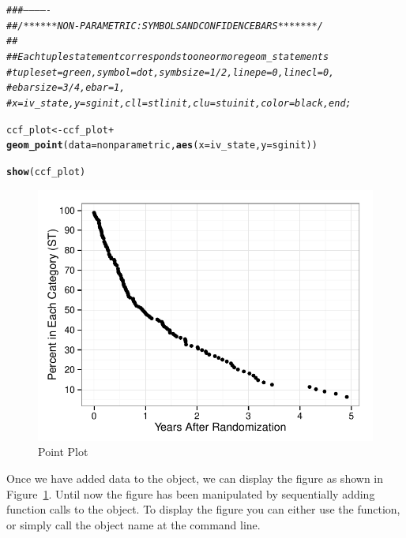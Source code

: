 \documentclass[nojss, letterpaper]{jss}\usepackage[]{graphicx}\usepackage[]{color}
\makeatletter
\def\maxwidth{ %
  \ifdim\Gin@nat@width>\linewidth
    \linewidth
  \else
    \Gin@nat@width
  \fi
}
\newcommand{\hlcom}[1]{\textcolor[rgb]{0.678,0.584,0.686}{\textit{#1}}}%
\newcommand{\hlopt}[1]{\textcolor[rgb]{0,0,0}{#1}}%
\newcommand{\hlstd}[1]{\textcolor[rgb]{0.345,0.345,0.345}{#1}}%
\newcommand{\hlkwb}[1]{\textcolor[rgb]{0.69,0.353,0.396}{#1}}%
\newcommand{\hlkwc}[1]{\textcolor[rgb]{0.333,0.667,0.333}{#1}}%
\newcommand{\hlkwd}[1]{\textcolor[rgb]{0.737,0.353,0.396}{\textbf{#1}}}%
\newenvironment{kframe}{%
 \def\at@end@of@kframe{}%
 \ifinner\ifhmode%
  \def\at@end@of@kframe{\end{minipage}}%
  \begin{minipage}{\columnwidth}%
 \fi\fi%
 \def\FrameCommand##1{\hskip\@totalleftmargin \hskip-\fboxsep
 \colorbox{shadecolor}{##1}\hskip-\fboxsep
     \hskip-\linewidth \hskip-\@totalleftmargin \hskip\columnwidth}%
 \MakeFramed {\advance\hsize-\width
   \@totalleftmargin\z@ \linewidth\hsize
   \@setminipage}}%
 {\par\unskip\endMakeFramed%
 \at@end@of@kframe}
\newenvironment{knitrout}{}{} %
\makeatother
\begin{document}
\begin{knitrout}\footnotesize
{}\color{fgcolor}\begin{kframe}
\begin{alltt}
\hlcom{###-------------}
\hlcom{## /******NON-PARAMETRIC: SYMBOLS AND CONFIDENCE BARS *******/}
\hlcom{##}
\hlcom{## Each tuple statement corresponds to one or more geom_ statements}
\hlcom{#     tuple set=green, symbol=dot, symbsize=1/2, linepe=0, linecl=0,}
\hlcom{#       ebarsize=3/4, ebar=1,}
\hlcom{#       x=iv_state, y=sginit, cll=stlinit, clu=stuinit, color=black, end;}

\hlstd{ccf_plot} \hlkwb{<-} \hlstd{ccf_plot} \hlopt{+}
  \hlkwd{geom_point}\hlstd{(}\hlkwc{data}\hlstd{=nonparametric,} \hlkwd{aes}\hlstd{(}\hlkwc{x}\hlstd{=iv_state,} \hlkwc{y}\hlstd{=sginit))}

\hlkwd{show}\hlstd{(ccf_plot)}
\end{alltt}
\end{kframe}\begin{figure}[htpb]


{\centering \includegraphics[width=\maxwidth]{figure/beamer-points} 

}

\caption[Point Plot]{Point Plot\label{F:points}}
\end{figure}


\end{knitrout}
Once we have added data to the  object, we can display the figure as shown in Figure~\ref{F:points}. Until now the figure has been manipulated by sequentially adding function calls to the  object. To display the figure you can either use the  function, or simply call the object name at the command line.
\end{document}
